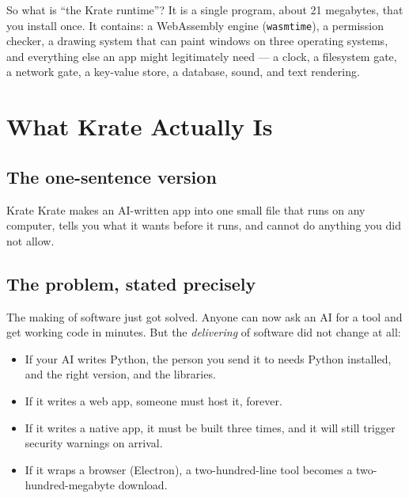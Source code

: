 \documentclass[11pt,a4paper]{report}
\begin{document}
\begin{plainbox}{So what is ``the Krate runtime''?}
It is a single program, about 21 megabytes, that you install once. It
contains: a WebAssembly engine (\texttt{wasmtime}), a permission checker,
a drawing system that can paint windows on three operating systems, and
everything else an app might legitimately need --- a clock, a filesystem
gate, a network gate, a key-value store, a database, sound, and text
rendering.
\end{plainbox}

\chapter{What Krate Actually Is}

\section{The one-sentence version}

\begin{plainbox}{Krate}
Krate makes an AI-written app into one small file that runs on any
computer, tells you what it wants before it runs, and cannot do anything
you did not allow.
\end{plainbox}

\section{The problem, stated precisely}

The making of software just got solved. Anyone can now ask an AI for a
tool and get working code in minutes. But the \emph{delivering} of software
did not change at all:

\begin{itemize}[leftmargin=*]
  \item If your AI writes Python, the person you send it to needs Python
    installed, and the right version, and the libraries.
  \item If it writes a web app, someone must host it, forever.
  \item If it writes a native app, it must be built three times, and it
    will still trigger security warnings on arrival.
  \item If it wraps a browser (Electron), a two-hundred-line tool becomes a
    two-hundred-megabyte download.
\end{itemize}
\end{document}

